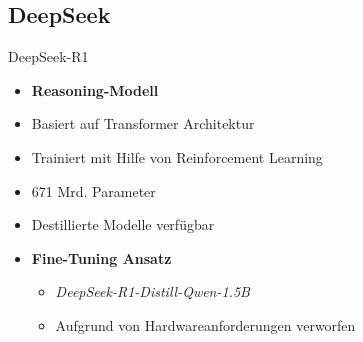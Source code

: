 \documentclass[aspectratio=169]{beamer} %
\begin{document}






\subsection{DeepSeek}

\begin{frame}{DeepSeek-R1}
\begin{itemize}
\item \textbf{Reasoning-Modell}
\item Basiert auf Transformer Architektur
\item Trainiert mit Hilfe von Reinforcement Learning
\item 671 Mrd. Parameter
\item Destillierte Modelle verfügbar
\end{itemize}
\vspace{0.4cm}

\begin{itemize}
    \item \textbf{Fine-Tuning Ansatz}
    \begin{itemize}
        \item \textit{DeepSeek-R1-Distill-Qwen-1.5B}
        \item Aufgrund von Hardwareanforderungen verworfen
\end{itemize}
\end{itemize}
\end{frame}
\end{document}
